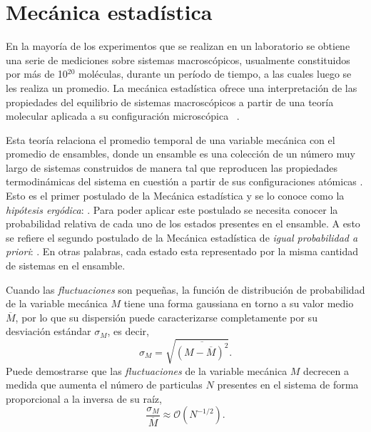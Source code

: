 \section{Mecánica estadística}

En la mayoría de los experimentos que se realizan en un laboratorio se obtiene 
una serie de mediciones sobre sistemas macroscópicos, usualmente constituidos por 
más de 10$^{20}$ moléculas, durante un período de tiempo, a las cuales luego se 
les realiza un promedio. La mecánica estadística ofrece una interpretación de 
las propiedades del equilibrio de sistemas macroscópicos a partir de una teoría 
molecular aplicada a su configuración microscópica ~\cite{hill1986}.

Esta teoría relaciona el promedio temporal de una variable mecánica con el 
promedio de ensambles, donde un ensamble es una colección de un número muy largo
de sistemas construidos de manera tal que reproducen las propiedades 
termodinámicas del sistema en cuestión a partir de sus configuraciones atómicas
\cite{salinas2001}. Esto es el primer postulado de la Mecánica estadística y se 
lo conoce como la \textit{hipótesis ergódica}: . Para poder aplicar
este postulado se necesita conocer la probabilidad relativa de cada uno de los 
estados presentes en el ensamble. A esto se refiere el segundo postulado de la 
Mecánica estadística de \textit{igual probabilidad a priori}: . En otras palabras, cada 
estado esta representado por la misma cantidad de sistemas en el ensamble.

Cuando las \textit{fluctuaciones} son pequeñas, la función de distribución de 
probabilidad de la variable mecánica $M$ tiene una forma gaussiana en torno a su 
valor medio $\overline{M}$, por lo que su dispersión puede caracterizarse 
completamente por su desviación estándar $\sigma_M$, es decir,
\begin{equation}
    \sigma_M = \sqrt{\overline{(M - \overline{M})^2}}.
\end{equation}
Puede demostrarse que las \textit{fluctuaciones} de la variable mecánica $M$ 
decrecen a medida que aumenta el número de particulas $N$ presentes en el sistema 
de forma proporcional a la inversa de su raíz,
\begin{equation}\label{eq:fluctuaciones}
    \frac{\sigma_M}{\overline{M}} \approx \mathcal{O}(N^{-1/2}).
\end{equation}






